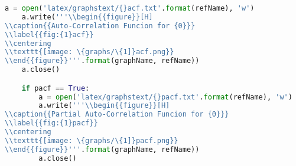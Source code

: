 \begin{lstlisting}[language=Python]
    a = open('latex/graphstext/{}acf.txt'.format(refName), 'w')
    a.write('''\\begin{{figure}}[H]
\\caption{{Auto-Correlation Funcion for {0}}}
\\label{{fig:{1}acf}}
\\centering
\\texttt{[image: \{graphs/\{1]}acf.png}}
\\end{{figure}}'''.format(graphName, refName))
    a.close() 

    if pacf == True:
        a = open('latex/graphstext/{}pacf.txt'.format(refName), 'w')
        a.write('''\\begin{{figure}}[H]
\\caption{{Partial Auto-Correlation Funcion for {0}}}
\\label{{fig:{1}pacf}}
\\centering
\\texttt{[image: \{graphs/\{1]}pacf.png}}
\\end{{figure}}'''.format(graphName, refName))
        a.close() 


        
\end{lstlisting}